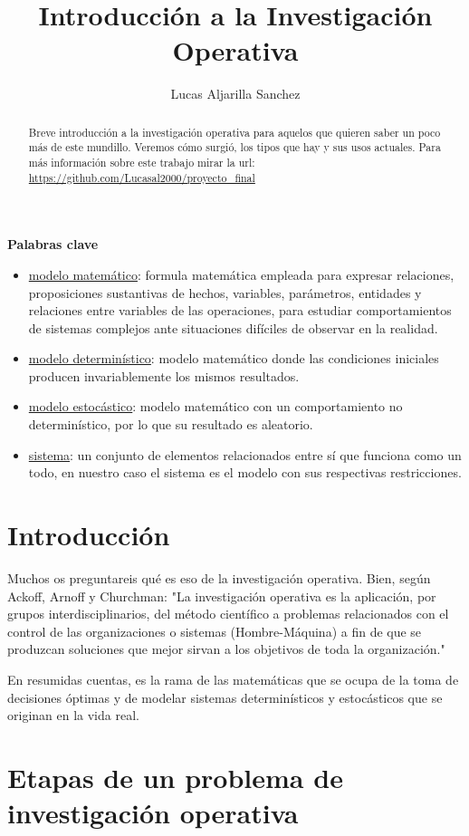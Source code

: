 \documentclass{article}
\author{Lucas Aljarilla Sanchez}
\title{Introducción a la Investigación Operativa}
\begin{document}
\maketitle
\begin{abstract}
Breve introducción a la investigación operativa para aquelos que quieren saber un poco más de este mundillo. Veremos cómo surgió, los tipos que hay y sus usos actuales. Para más información sobre este trabajo mirar la url: \url{https://github.com/Lucasal2000/proyecto_final} 
\end{abstract}
 \vfill
\textbf{Palabras clave}
\begin{itemize}
\item  \underline{modelo matemático}: formula matemática empleada para expresar relaciones, proposiciones sustantivas de hechos, variables, parámetros, entidades y relaciones entre variables de las operaciones, para estudiar comportamientos de sistemas complejos ante situaciones difíciles de observar en la realidad.
\item  \underline{modelo determinístico}: modelo matemático donde las condiciones iniciales producen invariablemente los mismos resultados.
\item  \underline{modelo estocástico}: modelo matemático con un comportamiento no determinístico, por lo que su resultado es aleatorio.
\item  \underline{sistema}: un conjunto de elementos relacionados entre sí que funciona como un todo, en nuestro caso el sistema es el modelo con sus respectivas restricciones. 
\end{itemize}

\section{Introducción}

Muchos os preguntareis qué es eso de la investigación operativa. Bien, según Ackoff, Arnoff y Churchman: "La investigación operativa es la aplicación, por grupos interdisciplinarios, del método científico a problemas relacionados con el control de las organizaciones o sistemas (Hombre-Máquina) a fin de que se produzcan soluciones que mejor sirvan a los objetivos de toda la organización."

En resumidas cuentas, es la rama de las matemáticas que se ocupa de la toma de decisiones óptimas y de modelar sistemas determinísticos y estocásticos que se originan en la vida real.

\section{Etapas de un problema de investigación operativa}
\end{document}
